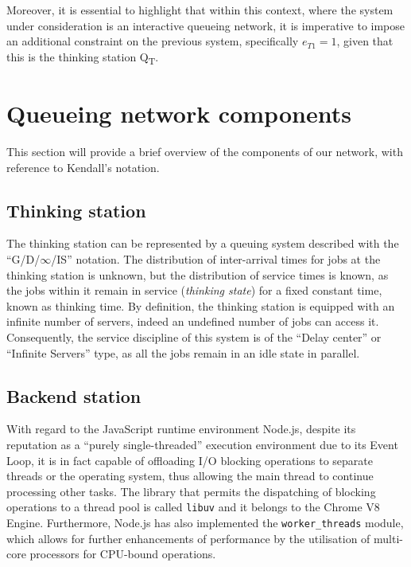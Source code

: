 Moreover, it is essential to highlight that within this context, where the system under consideration is an interactive queueing network, it is imperative to impose an additional constraint on the previous system, specifically $e_{T1}=1$, given that this is the thinking station Q\textsubscript{T}.

\section{Queueing network components}

This section will provide a brief overview of the components of our network, with reference to Kendall's notation.

\subsection{Thinking station}

The thinking station can be represented by a queuing system described with the \newline ``G/D/$\infty$/IS'' notation.
The distribution of inter-arrival times for jobs at the thinking station is unknown, but the distribution of service times is known, as the jobs within it remain in service (\textit{thinking state}) for a fixed constant time, known as thinking time.
By definition, the thinking station is equipped with an infinite number of servers, indeed an undefined number of jobs can access it.
Consequently, the service discipline of this system is of the ``Delay center'' or ``Infinite Servers'' type, as all the jobs remain in an idle state in parallel.

\subsection{Backend station}

With regard to the JavaScript runtime environment Node.js, despite its reputation as a ``purely single-threaded'' execution environment due to its Event Loop, it is in fact capable of offloading I/O blocking operations to separate threads or the operating system, thus allowing the main thread to continue processing other tasks.
The library that permits the dispatching of blocking operations to a thread pool is called \verb|libuv| and it belongs to the Chrome V8 Engine.
Furthermore, Node.js has also implemented the \verb|worker_threads| module, which allows for further enhancements of performance by the utilisation of multi-core processors for CPU-bound operations.


